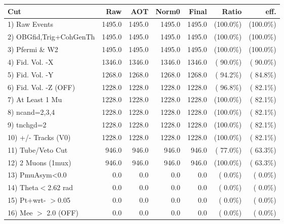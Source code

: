  \begin{table}[h!]\centering
 \begin{tabular}{||l||r|r|r|r|r|r||}
 \hline
 \hline
 Cut & Raw & AOT & Norm0 & Final & Ratio & eff.       \\
 \hline
  1) Raw Events           &       1495.0 &       1495.0 &       1495.0 &       1495.0 & (100.0\%) & (100.0\%) \\
  2) OBGfid,Trig+CohGenTh &       1495.0 &       1495.0 &       1495.0 &       1495.0 & (100.0\%) & (100.0\%) \\
  3) Pfermi \& W2         &       1495.0 &       1495.0 &       1495.0 &       1495.0 & (100.0\%) & (100.0\%) \\
  4) Fid. Vol. -X         &       1346.0 &       1346.0 &       1346.0 &       1346.0 & ( 90.0\%) & ( 90.0\%) \\
  5) Fid. Vol. -Y         &       1268.0 &       1268.0 &       1268.0 &       1268.0 & ( 94.2\%) & ( 84.8\%) \\
  6) Fid. Vol. -Z (OFF)   &       1228.0 &       1228.0 &       1228.0 &       1228.0 & ( 96.8\%) & ( 82.1\%) \\
  7) At Least 1 Mu        &       1228.0 &       1228.0 &       1228.0 &       1228.0 & (100.0\%) & ( 82.1\%) \\
  8) ncand=2,3,4          &       1228.0 &       1228.0 &       1228.0 &       1228.0 & (100.0\%) & ( 82.1\%) \\
  9) tnchgd=2             &       1228.0 &       1228.0 &       1228.0 &       1228.0 & (100.0\%) & ( 82.1\%) \\
 10) +/- Tracks (V0)      &       1228.0 &       1228.0 &       1228.0 &       1228.0 & (100.0\%) & ( 82.1\%) \\
 11) Tube/Veto Cut        &        946.0 &        946.0 &        946.0 &        946.0 & ( 77.0\%) & ( 63.3\%) \\
 12) 2 Muons (1mux)       &        946.0 &        946.0 &        946.0 &        946.0 & (100.0\%) & ( 63.3\%) \\
 13) PmuAsym<0.0          &          0.0 &          0.0 &          0.0 &          0.0 & (  0.0\%) & (  0.0\%) \\
 14) Theta$<$2.62 rad     &          0.0 &          0.0 &          0.0 &          0.0 & (  0.0\%) & (  0.0\%) \\
 15) Pt+wrt- $>$0.05      &          0.0 &          0.0 &          0.0 &          0.0 & (  0.0\%) & (  0.0\%) \\
 16) Mee $>$ 2.0  (OFF)   &          0.0 &          0.0 &          0.0 &          0.0 & (  0.0\%) & (  0.0\%) \\

\end{tabular}
\end{table}
